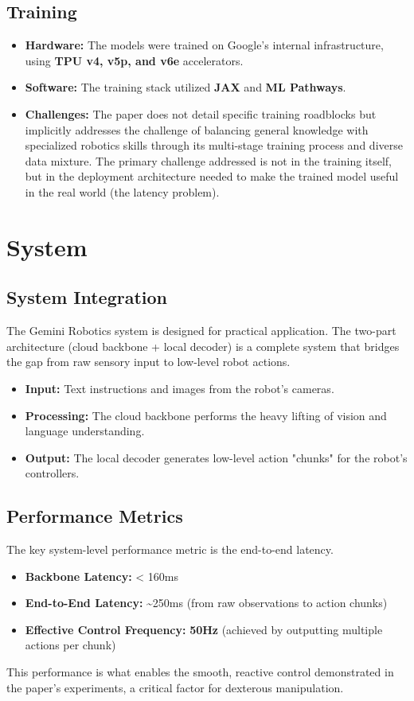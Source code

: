 \documentclass{article}
\begin{document}
\subsection{Training}
\begin{itemize}
    \item \textbf{Hardware:} The models were trained on Google's internal infrastructure, using \textbf{TPU v4, v5p, and v6e} accelerators.
    \item \textbf{Software:} The training stack utilized \textbf{JAX} and \textbf{ML Pathways}.
    \item \textbf{Challenges:} The paper does not detail specific training roadblocks but implicitly addresses the challenge of balancing general knowledge with specialized robotics skills through its multi-stage training process and diverse data mixture. The primary challenge addressed is not in the training itself, but in the deployment architecture needed to make the trained model useful in the real world (the latency problem).
\end{itemize}

\section{System}
\subsection{System Integration}
The Gemini Robotics system is designed for practical application. The two-part architecture (cloud backbone + local decoder) is a complete system that bridges the gap from raw sensory input to low-level robot actions.
\begin{itemize}
    \item \textbf{Input:} Text instructions and images from the robot's cameras.
    \item \textbf{Processing:} The cloud backbone performs the heavy lifting of vision and language understanding.
    \item \textbf{Output:} The local decoder generates low-level action "chunks" for the robot's controllers.
\end{itemize}

\subsection{Performance Metrics}
The key system-level performance metric is the end-to-end latency.
\begin{itemize}
    \item \textbf{Backbone Latency:} < 160ms
    \item \textbf{End-to-End Latency:} \textasciitilde 250ms (from raw observations to action chunks)
    \item \textbf{Effective Control Frequency:} \textbf{50Hz} (achieved by outputting multiple actions per chunk)
\end{itemize}
This performance is what enables the smooth, reactive control demonstrated in the paper's experiments, a critical factor for dexterous manipulation.
\end{document}
